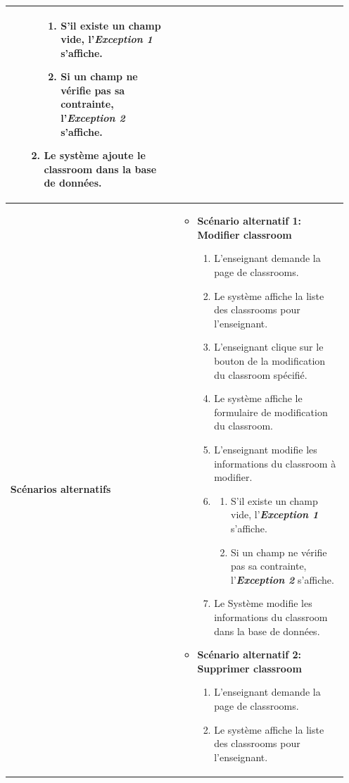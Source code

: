 \begin{itemize}[itemsep=1pt, parsep=1pt]
\begin{longtable}{|>{\RaggedRight\arraybackslash}p{4cm}|>{\RaggedRight\arraybackslash}p{12cm}|}
\begin{itemize}[label=]
\begin{enumerate}
\begin{enumerate}
                    \item S’il existe un champ vide, l’\textbf{\textit{Exception 1}} s’affiche. 
                    \item Si un champ ne vérifie pas sa contrainte, l’\textbf{\textit{Exception 2}} s’affiche.
                \end{enumerate}
                \item Le système ajoute le classroom dans la base de données.
            \end{enumerate}
        \end{itemize} \\
        \hline
        \textbf{Scénarios alternatifs} & 
        \begin{itemize}[label=]
            \item \textbf{Scénario alternatif 1: Modifier classroom}
            \begin{enumerate}
                \item L’enseignant demande la page de classrooms.
                \item Le système affiche la liste des classrooms pour l’enseignant. 
                \item L’enseignant clique sur le bouton de la modification du classroom spécifié.
                \item Le système affiche le formulaire de modification du classroom.  
                \item L’enseignant modifie les informations du classroom à modifier. 
                \item 
                \begin{enumerate}
                    \item S’il existe un champ vide, l’\textbf{\textit{Exception 1}} s’affiche. 
                    \item Si un champ ne vérifie pas sa contrainte, l’\textbf{\textit{Exception 2}} s’affiche.
                \end{enumerate}
                \item Le Système modifie les informations du classroom dans la base de données.
            \end{enumerate}
            \item \textbf{Scénario alternatif 2: Supprimer classroom}
            \begin{enumerate}
                \item L’enseignant demande la page de classrooms.
                \item Le système affiche la liste des classrooms pour l’enseignant. 

\end{enumerate}
\end{itemize}
\end{longtable}
\end{itemize}

